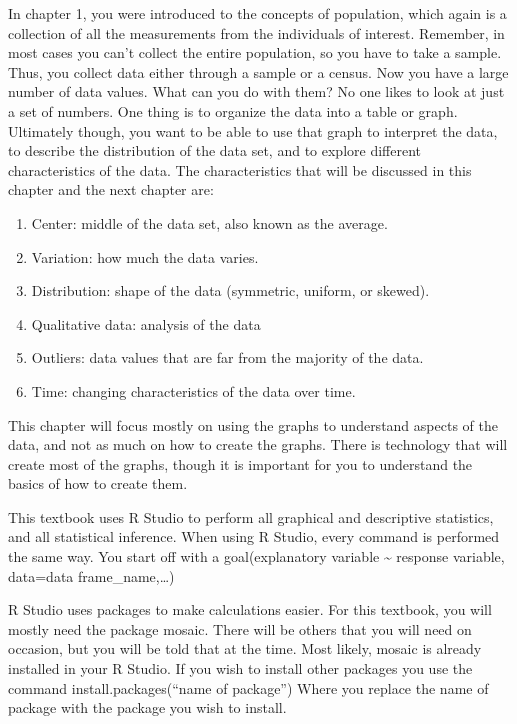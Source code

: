 \documentclass[]{book}
\providecommand{\tightlist}{%
  \setlength{\itemsep}{0pt}\setlength{\parskip}{0pt}}
\begin{document}
In chapter 1, you were introduced to the concepts of population, which again is a collection of all the measurements from the individuals of interest. Remember, in most cases you can't collect the entire population, so you have to take a sample. Thus, you collect data either through a sample or a census. Now you have a large number of data values. What can you do with them? No one likes to look at just a set of numbers. One thing is to organize the data into a table or graph. Ultimately though, you want to be able to use that graph to interpret the data, to describe the distribution of the data set, and to explore different characteristics of the data. The characteristics that will be discussed in this chapter and the next chapter are:

\begin{enumerate}
\def\labelenumi{\arabic{enumi}.}
\tightlist
\item
  Center: middle of the data set, also known as the average.
\item
  Variation: how much the data varies.
\item
  Distribution: shape of the data (symmetric, uniform, or skewed).
\item
  Qualitative data: analysis of the data
\item
  Outliers: data values that are far from the majority of the data.
\item
  Time: changing characteristics of the data over time.
\end{enumerate}

This chapter will focus mostly on using the graphs to understand aspects of the data, and not as much on how to create the graphs. There is technology that will create most of the graphs, though it is important for you to understand the basics of how to create them.

This textbook uses R Studio to perform all graphical and descriptive statistics, and all statistical inference. When using R Studio, every command is performed the same way. You start off with a goal(explanatory variable \textasciitilde{} response variable, data=data frame\_name,\ldots{})

R Studio uses packages to make calculations easier. For this textbook, you will mostly need the package mosaic. There will be others that you will need on occasion, but you will be told that at the time. Most likely, mosaic is already installed in your R Studio. If you wish to install other packages you use the command install.packages(``name of package'') Where you replace the name of package with the package you wish to install.
\end{document}
